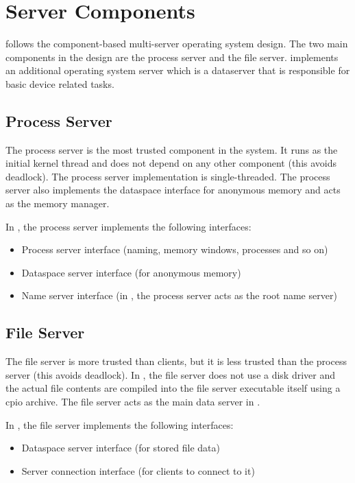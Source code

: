 \section{Server Components}

 follows the component-based multi-server operating system design. The two main components in the design are the process server and the file server.  implements an additional operating system server which is a dataserver that is responsible for basic device related tasks.

\subsection{Process Server}

The process server is the most trusted component in the system. It runs as the initial kernel thread and does not depend on any other component (this avoids deadlock). The process server implementation is single-threaded. The process server also implements the dataspace interface for anonymous memory and acts as the memory manager.

In , the process server implements the following interfaces:
\begin{itemize}
    \item Process server interface (naming, memory windows, processes and so on)
    \item Dataspace server interface (for anonymous memory)
    \item Name server interface (in , the process server acts as the root name server)
\end{itemize}

\subsection{File Server}

The file server is more trusted than clients, but it is less trusted than the process server (this avoids deadlock). In , the file server does not use a disk driver and the actual file contents are compiled into the file server executable itself using a cpio archive. The file server acts as the main data server in .

In , the file server implements the following interfaces:
\begin{itemize}
    \item Dataspace server interface (for stored file data)
    \item Server connection interface (for clients to connect to it)
\end{itemize}


